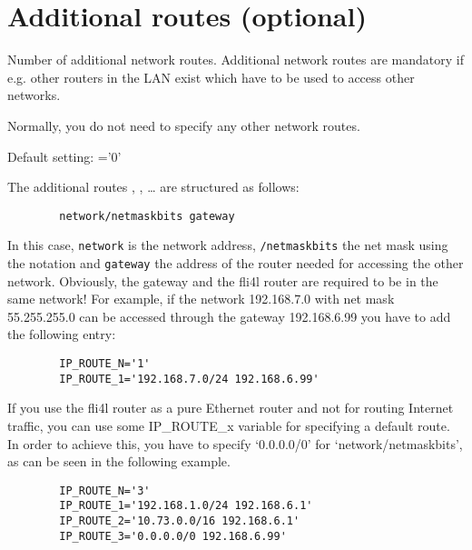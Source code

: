 
\section{Additional routes (optional)}

\begin{description}


  {Number of additional network routes. Additional network routes are mandatory
  if e.g. other routers in the LAN exist which have to be used to access
  other networks.

  Normally, you do not need to specify any other network routes.
  
    Default setting: ='0'}


  {The additional routes , , \ldots
    are structured as follows:

\begin{example}
\begin{verbatim}
        network/netmaskbits gateway
\end{verbatim}
\end{example}

    In this case, \texttt{network} is the network address, \texttt{/netmaskbits} the net mask
    using the  notation and \texttt{gateway} the address of
    the router needed for accessing the other network. Obviously, the gateway
    and the fli4l router are required to be in the same network!
    For example, if the network 192.168.7.0 with net mask 55.255.255.0 can
    be accessed through the gateway 192.168.6.99 you have to add the
    following entry:

\begin{example}
\begin{verbatim}
        IP_ROUTE_N='1'
        IP_ROUTE_1='192.168.7.0/24 192.168.6.99'
\end{verbatim}
\end{example}}

    If you use the fli4l router as a pure Ethernet router and not for routing
    Internet traffic, you can use some IP\_ROUTE\_x variable for specifying
    a default route. In order to achieve this, you have to specify `0.0.0.0/0'
    for `network/netmaskbits', as can be seen in the following example.

\begin{example}
\begin{verbatim}
        IP_ROUTE_N='3'
        IP_ROUTE_1='192.168.1.0/24 192.168.6.1'
        IP_ROUTE_2='10.73.0.0/16 192.168.6.1'
        IP_ROUTE_3='0.0.0.0/0 192.168.6.99'
\end{verbatim}
\end{example}

  \end{description}
